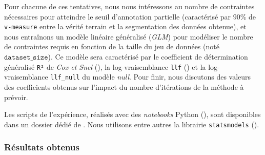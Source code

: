 			Pour chacune de ces tentatives, nous nous intéressons au nombre de contraintes nécessaires pour atteindre le seuil d'annotation partielle (caractérisé par $90$\% de \texttt{v-measure} entre la vérité terrain et la segmentation des données obtenue), et nous entraînons un modèle linéaire généralisé (\textit{GLM}) pour modéliser le nombre de contraintes requis en fonction de la taille du jeu de données (noté $\texttt{dataset\_size}$).
			Ce modèle sera caractérisé par le coefficient de détermination généralisé \texttt{R²} de \textit{Cox et Snel} (\cite{diamond-etal:1990:analysis-binary-data}), la log-vraisemblance \texttt{llf} (\cite{edwards:1992:likelihood}) et la log-vraisemblance \texttt{llf\_null} du modèle \textit{null}.
			Pour finir, nous discutons des valeurs des coefficients obtenus sur l'impact du nombre d'itérations de la méthode à prévoir.

			\begin{leftBarInformation}
				Les scripts de l'expérience, réalisés avec des \textit{notebooks} Python (\cite{van-rossum-drake:2009:python-reference-manual}), sont disponibles dans un dossier dédié de \cite{schild:2021:cognitivefactory-interactiveclusteringcomparativestudy}.
				Nous utilisons entre autres la librairie \texttt{statsmodels} (\cite{seabold-perktold:2010:statsmodels-econometric-statistical}).
			\end{leftBarInformation}

		\subsubsection{Résultats obtenus}
		
